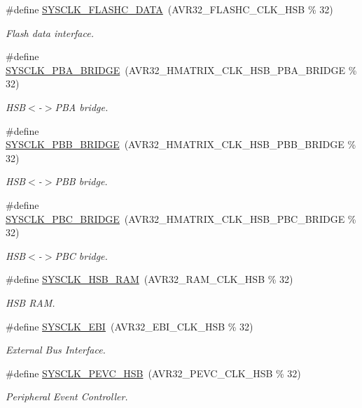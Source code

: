 \begin{DoxyCompactItemize}
\#define \hyperlink{group__sysclk__group_gaa4659bfb4205b768f6846cbfcc2ec7dd}{\-S\-Y\-S\-C\-L\-K\-\_\-\-F\-L\-A\-S\-H\-C\-\_\-\-D\-A\-T\-A}~(\-A\-V\-R32\-\_\-\-F\-L\-A\-S\-H\-C\-\_\-\-C\-L\-K\-\_\-\-H\-S\-B \% 32)
\begin{DoxyCompactList}\small\item\em \-Flash data interface. \end{DoxyCompactList}\item 
\#define \hyperlink{group__sysclk__group_ga9e400e99e4e4b8f66b3a6d4c7b70611e}{\-S\-Y\-S\-C\-L\-K\-\_\-\-P\-B\-A\-\_\-\-B\-R\-I\-D\-G\-E}~(\-A\-V\-R32\-\_\-\-H\-M\-A\-T\-R\-I\-X\-\_\-\-C\-L\-K\-\_\-\-H\-S\-B\-\_\-\-P\-B\-A\-\_\-\-B\-R\-I\-D\-G\-E \% 32)
\begin{DoxyCompactList}\small\item\em \-H\-S\-B$<$-\/$>$\-P\-B\-A bridge. \end{DoxyCompactList}\item 
\#define \hyperlink{group__sysclk__group_gaafe37377751bd916833b911fb54de660}{\-S\-Y\-S\-C\-L\-K\-\_\-\-P\-B\-B\-\_\-\-B\-R\-I\-D\-G\-E}~(\-A\-V\-R32\-\_\-\-H\-M\-A\-T\-R\-I\-X\-\_\-\-C\-L\-K\-\_\-\-H\-S\-B\-\_\-\-P\-B\-B\-\_\-\-B\-R\-I\-D\-G\-E \% 32)
\begin{DoxyCompactList}\small\item\em \-H\-S\-B$<$-\/$>$\-P\-B\-B bridge. \end{DoxyCompactList}\item 
\#define \hyperlink{group__sysclk__group_ga94aa5b488b09dc743ddca6c884660873}{\-S\-Y\-S\-C\-L\-K\-\_\-\-P\-B\-C\-\_\-\-B\-R\-I\-D\-G\-E}~(\-A\-V\-R32\-\_\-\-H\-M\-A\-T\-R\-I\-X\-\_\-\-C\-L\-K\-\_\-\-H\-S\-B\-\_\-\-P\-B\-C\-\_\-\-B\-R\-I\-D\-G\-E \% 32)
\begin{DoxyCompactList}\small\item\em \-H\-S\-B$<$-\/$>$\-P\-B\-C bridge. \end{DoxyCompactList}\item 
\#define \hyperlink{group__sysclk__group_gaff6d7baf5d4926d22f50ca1bfb738424}{\-S\-Y\-S\-C\-L\-K\-\_\-\-H\-S\-B\-\_\-\-R\-A\-M}~(\-A\-V\-R32\-\_\-\-R\-A\-M\-\_\-\-C\-L\-K\-\_\-\-H\-S\-B \% 32)
\begin{DoxyCompactList}\small\item\em \-H\-S\-B \-R\-A\-M. \end{DoxyCompactList}\item 
\#define \hyperlink{group__sysclk__group_ga30be147da40e89c8ea7fa6fd0ed30129}{\-S\-Y\-S\-C\-L\-K\-\_\-\-E\-B\-I}~(\-A\-V\-R32\-\_\-\-E\-B\-I\-\_\-\-C\-L\-K\-\_\-\-H\-S\-B \% 32)
\begin{DoxyCompactList}\small\item\em \-External \-Bus \-Interface. \end{DoxyCompactList}\item 
\#define \hyperlink{group__sysclk__group_ga15c11d0c318f04ca3169fda32aea1bee}{\-S\-Y\-S\-C\-L\-K\-\_\-\-P\-E\-V\-C\-\_\-\-H\-S\-B}~(\-A\-V\-R32\-\_\-\-P\-E\-V\-C\-\_\-\-C\-L\-K\-\_\-\-H\-S\-B \% 32)
\begin{DoxyCompactList}\small\item\em \-Peripheral \-Event \-Controller. \end{DoxyCompactList}\end{DoxyCompactItemize}
